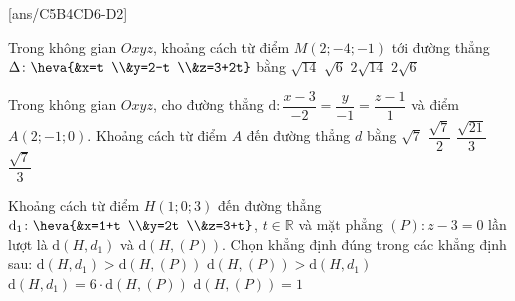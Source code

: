 \TN
{}[ans/C5B4CD6-D2]
\begin{ex}%
	Trong không gian $Oxyz$, khoảng cách từ điểm $M(2;-4;-1)$ tới đường thẳng $\Delta\colon \heva{&x=t \\&y=2-t \\&z=3+2t}$ bằng
	\choice
	{$\sqrt{14}$}
	{$\sqrt{6}$}
	{\True $2\sqrt{14}$}
	{$2\sqrt{6}$}
\end{ex}
\begin{ex}%
	Trong không gian $Oxyz$, cho đường thẳng $\mathrm{d}\colon\dfrac{x-3}{-2}=\dfrac{y}{-1}=\dfrac{z-1}{1}$ và điểm $A(2;-1;0)$. Khoảng cách từ điểm $A$ đến đường thẳng $d$ bằng
	\choice
	{$\sqrt{7}$}
	{$\dfrac{\sqrt{7}}{2}$}
	{\True $\dfrac{\sqrt{21}}{3}$}
	{$\dfrac{\sqrt{7}}{3}$}
\end{ex}
\begin{ex}%
	Khoảng cách từ điểm $H(1;0;3)$ đến đường thẳng $\mathrm{d}_1\colon \heva{&x=1+t \\&y=2t \\&z=3+t}$, $t\in \mathbb{R}$ và mặt phẳng $(P)\colon z-3=0$ lần lượt là $\mathrm{d}(H,d_1)$ và $\mathrm{d}(H,(P))$. Chọn khẳng định đúng trong các khẳng định sau:
	\choice
	{$\mathrm{d}(H,d_1)>\mathrm{d}(H,(P))$}
	{$\mathrm{d}(H,(P))>\mathrm{d}(H,d_1)$}
	{\True $\mathrm{d}(H,d_1)=6\cdot \mathrm{d}(H,(P))$}
	{$\mathrm{d}(H,(P))=1$}
\end{ex}

